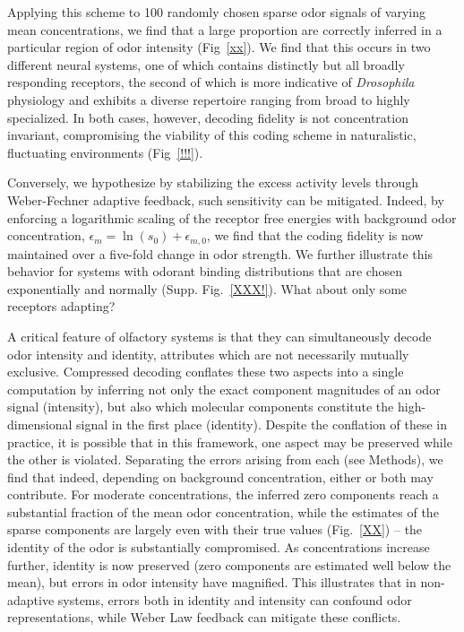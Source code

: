 Applying this scheme to 100 randomly chosen sparse odor signals of varying mean concentrations, we find that a large proportion are correctly inferred in a particular region of odor intensity (Fig~\ref{xx}). We find that this occurs in two different neural systems, one of which contains distinctly but all broadly responding receptors, the second of which is more indicative of \textit{Drosophila} physiology and exhibits a diverse repertoire ranging from broad to highly specialized. In both cases, however, decoding fidelity is not concentration invariant, compromising the viability of this coding scheme in naturalistic, fluctuating environments (Fig~\ref{!!!}). 

Conversely, we hypothesize by stabilizing the excess activity levels through Weber-Fechner adaptive feedback, such sensitivity can be mitigated. Indeed, by enforcing a logarithmic scaling of the receptor free energies with background odor concentration, $\epsilon_m = \ln(s_0) + \epsilon_{m, 0}$, we find that the coding fidelity is now maintained over a five-fold change in odor strength. We further illustrate this behavior for systems with odorant binding distributions that are chosen exponentially and normally (Supp. Fig.~\ref{XXX!}). {\color{blue} What about only some receptors adapting?}



A critical feature of olfactory systems is that they can simultaneously decode odor intensity and identity, attributes which are not necessarily mutually exclusive. Compressed decoding conflates these two aspects into a single computation by inferring not only the exact component magnitudes of an odor signal (intensity), but also which molecular components constitute the high-dimensional signal in the first place (identity). Despite the conflation of these in practice, it is possible that in this framework, one aspect may be preserved while the other is violated. Separating the errors arising from each (see Methods), we find that indeed, depending on background concentration, either or both may contribute. For moderate concentrations, the inferred zero components reach a substantial fraction of the mean odor concentration, while the estimates of the sparse components are largely even with their true values (Fig.~\ref{XX}) -- the identity of the odor is substantially compromised. As concentrations increase further, identity is now preserved (zero components are estimated well below the mean), but errors in odor intensity have magnified. This illustrates that in non-adaptive systems, errors both in identity and intensity can confound odor representations, while Weber Law feedback can mitigate these conflicts. 

